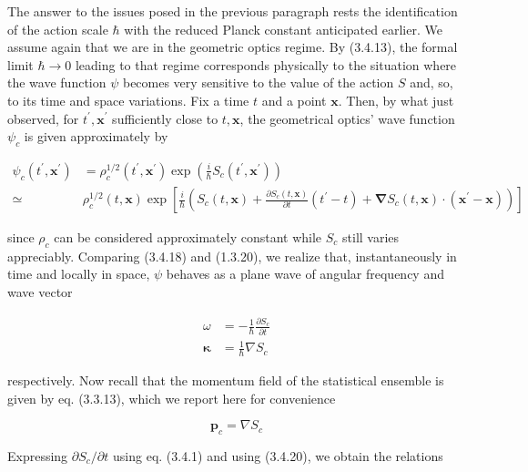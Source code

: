 \documentclass{article}
\begin{document}
The answer to the issues posed in the previous paragraph rests the identification of the action scale $\hbar$ with the reduced Planck constant anticipated earlier. We assume again that we are in the geometric optics regime. By (3.4.13), the formal limit $\hbar \rightarrow 0$ leading to that regime corresponds physically to the situation where the wave function $\psi$ becomes very sensitive to the value of the action $S$ and, so, to its time and space variations. Fix a time $t$ and a point $\boldsymbol{x}$. Then, by what just observed, for $t^{\prime}, \boldsymbol{x}^{\prime}$ sufficiently close to $t, \boldsymbol{x}$, the geometrical optics' wave function $\psi_{c}$ is given approximately by
 
\begin{align*}
\psi_{c}\left(t^{\prime}, \boldsymbol{x}^{\prime}\right) & =\rho_{c}^{1 / 2}\left(t^{\prime}, \boldsymbol{x}^{\prime}\right) \exp \left(\frac{i}{\hbar} S_{c}\left(t^{\prime}, \boldsymbol{x}^{\prime}\right)\right)  \tag{3.4.18}\\
\simeq & \rho_{c}^{1 / 2}(t, \boldsymbol{x}) \exp \left[\frac{i}{\hbar}\left(S_{c}(t, \boldsymbol{x})+\frac{\partial S_{c}(t, \boldsymbol{x})}{\partial t}\left(t^{\prime}-t\right)+\boldsymbol{\nabla} S_{c}(t, \boldsymbol{x}) \cdot\left(\boldsymbol{x}^{\prime}-\boldsymbol{x}\right)\right)\right]
\end{align*}
 
since $\rho_{c}$ can be considered approximately constant while $S_{c}$ still varies appreciably. Comparing (3.4.18) and (1.3.20), we realize that, instantaneously in time and locally in space, $\psi$ behaves as a plane wave of angular frequency and wave vector
 
\begin{align*}
\omega & =-\frac{1}{\hbar} \frac{\partial S_{c}}{\partial t}  \tag{3.4.19a}\\
\boldsymbol{\kappa} & =\frac{1}{\hbar} \nabla S_{c} \tag{3.4.19b}
\end{align*}
 
respectively. Now recall that the momentum field of the statistical ensemble is given by eq. (3.3.13), which we report here for convenience
 
\begin{equation*}
\boldsymbol{p}_{c}=\nabla S_{c} \tag{3.4.20}
\end{equation*}
 

Expressing $\partial S_{c} / \partial t$ using eq. (3.4.1) and using (3.4.20), we obtain the relations
 
\end{document}
